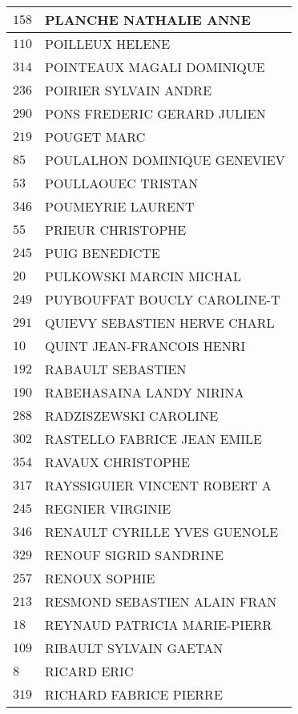 \begin{xltabular}{\linewidth}{|l|X|}
    \hline
    $158$ & PLANCHE NATHALIE ANNE \\
    \hline
    $110$ & POILLEUX HELENE \\
    \hline
    $314$ & POINTEAUX MAGALI DOMINIQUE \\
    \hline
    $236$ & POIRIER SYLVAIN ANDRE \\
    \hline
    $290$ & PONS FREDERIC GERARD JULIEN \\
    \hline
    $219$ & POUGET MARC \\
    \hline
    $85$ & POULALHON DOMINIQUE GENEVIEV \\
    \hline
    $53$ & POULLAOUEC TRISTAN \\
    \hline
    $346$ & POUMEYRIE LAURENT \\
    \hline
    $55$ & PRIEUR CHRISTOPHE \\
    \hline
    $245$ & PUIG BENEDICTE \\
    \hline
    $20$ & PULKOWSKI MARCIN MICHAL \\
    \hline
    $249$ & PUYBOUFFAT BOUCLY CAROLINE-T \\
    \hline
    $291$ & QUIEVY SEBASTIEN HERVE CHARL \\
    \hline
    $10$ & QUINT JEAN-FRANCOIS HENRI \\
    \hline
    $192$ & RABAULT SEBASTIEN \\
    \hline
    $190$ & RABEHASAINA LANDY NIRINA \\
    \hline
    $288$ & RADZISZEWSKI CAROLINE \\
    \hline
    $302$ & RASTELLO FABRICE JEAN EMILE \\
    \hline
    $354$ & RAVAUX CHRISTOPHE \\
    \hline
    $317$ & RAYSSIGUIER VINCENT ROBERT A \\
    \hline
    $245$ & REGNIER VIRGINIE \\
    \hline
    $346$ & RENAULT CYRILLE YVES GUENOLE \\
    \hline
    $329$ & RENOUF SIGRID SANDRINE \\
    \hline
    $257$ & RENOUX SOPHIE \\
    \hline
    $213$ & RESMOND SEBASTIEN ALAIN FRAN \\
    \hline
    $18$ & REYNAUD PATRICIA MARIE-PIERR \\
    \hline
    $109$ & RIBAULT SYLVAIN GAETAN \\
    \hline
    $8$ & RICARD ERIC \\
    \hline
    $319$ & RICHARD FABRICE PIERRE \\

\end{xltabular}
